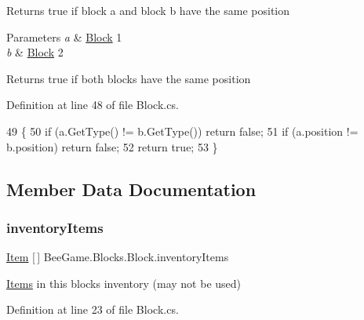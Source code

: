 Returns true if block a and block b have the same position 


\begin{DoxyParams}{Parameters}
{\em a} & \hyperlink{class_bee_game_1_1_blocks_1_1_block}{Block} 1\\
\hline
{\em b} & \hyperlink{class_bee_game_1_1_blocks_1_1_block}{Block} 2\\
\hline
\end{DoxyParams}
\begin{DoxyReturn}{Returns}
true if both blocks have the same position
\end{DoxyReturn}


Definition at line 48 of file Block.\+cs.


\begin{DoxyCode}
49         \{
50             \textcolor{keywordflow}{if} (a.GetType() != b.GetType()) \textcolor{keywordflow}{return} \textcolor{keyword}{false};
51             \textcolor{keywordflow}{if} (a.position != b.position) \textcolor{keywordflow}{return} \textcolor{keyword}{false};
52             \textcolor{keywordflow}{return} \textcolor{keyword}{true};
53         \}
\end{DoxyCode}


\subsection{Member Data Documentation}
\mbox{\label{class_bee_game_1_1_blocks_1_1_block_a54846c7c7ec2f512484b3060de977fac}} 
\subsubsection{\texorpdfstring{inventory\+Items}{inventoryItems}}
{\footnotesize\ttfamily \hyperlink{struct_bee_game_1_1_items_1_1_item}{Item} \mbox{[}$\,$\mbox{]} Bee\+Game.\+Blocks.\+Block.\+inventory\+Items}



\hyperlink{namespace_bee_game_1_1_items}{Items} in this blocks inventory (may not be used) 



Definition at line 23 of file Block.\+cs.

\mbox{\label{class_bee_game_1_1_blocks_1_1_block_addc8d61c8acab21b0f15df5fed804f11}} 
